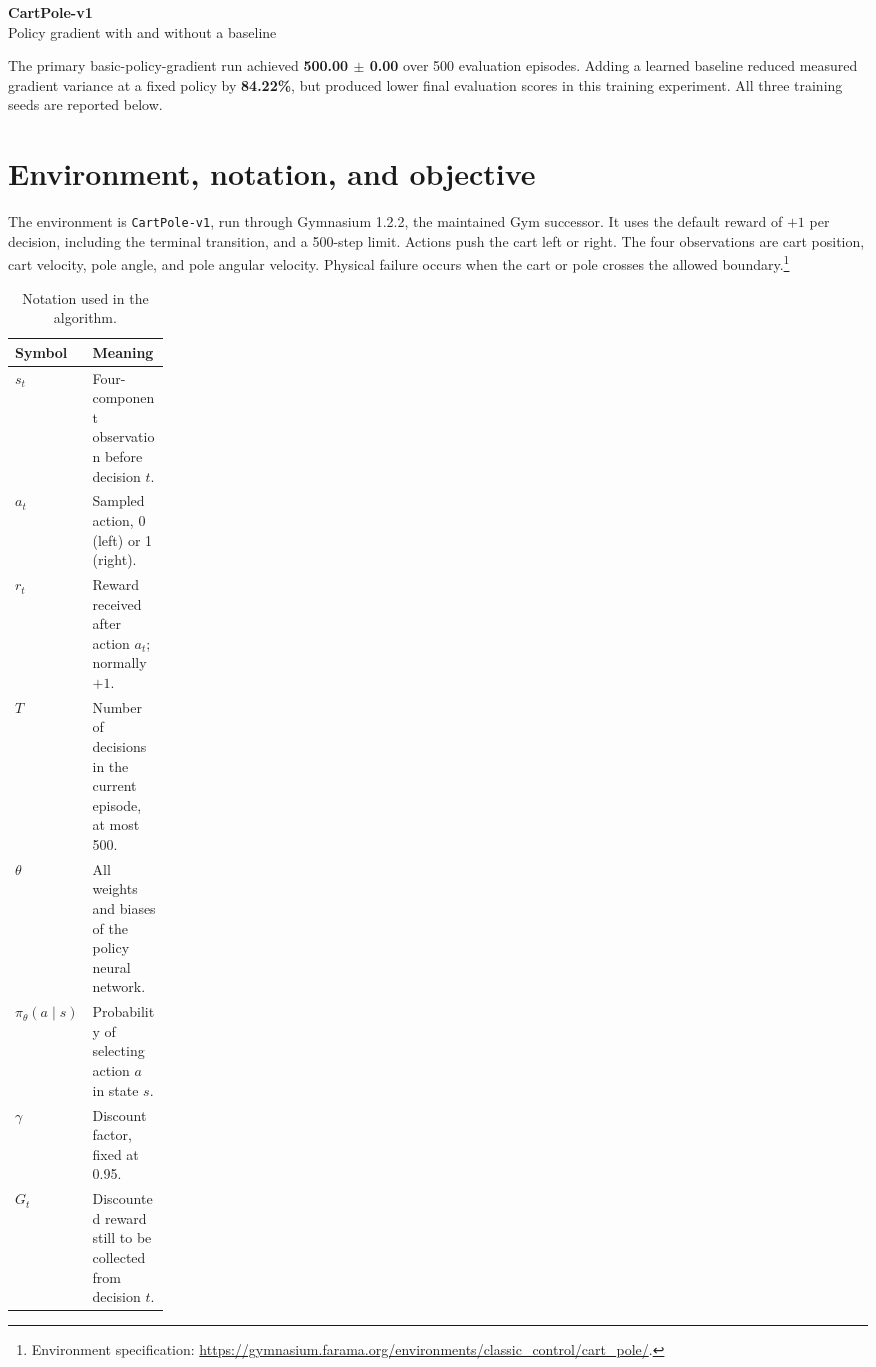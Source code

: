 \documentclass[11pt,letterpaper]{article}
\begin{document}
\begin{center}
{\LARGE\bfseries\color{navy} CartPole-v1}\\[5pt]
{\large Policy gradient with and without a baseline}
\end{center}

The primary basic-policy-gradient run achieved \textbf{500.00 $\pm$ 0.00} over 500 evaluation episodes. Adding a learned baseline reduced measured gradient variance at a fixed policy by \textbf{84.22\%}, but produced lower final evaluation scores in this training experiment. All three training seeds are reported below.

\section{Environment, notation, and objective}
The environment is \texttt{CartPole-v1}, run through Gymnasium 1.2.2, the maintained Gym successor. It uses the default reward of $+1$ per decision, including the terminal transition, and a 500-step limit. Actions push the cart left or right. The four observations are cart position, cart velocity, pole angle, and pole angular velocity. Physical failure occurs when the cart or pole crosses the allowed boundary.\footnote{Environment specification: \url{https://gymnasium.farama.org/environments/classic_control/cart_pole/}.}

\begin{table}[!ht]
\centering
\caption{Notation used in the algorithm.}
\begin{tabularx}{\linewidth}{@{}p{0.18\linewidth}X@{}}
\toprule
Symbol & Meaning\\
\midrule
$s_t$ & Four-component observation before decision $t$.\\
$a_t$ & Sampled action, 0 (left) or 1 (right).\\
$r_t$ & Reward received after action $a_t$; normally $+1$.\\
$T$ & Number of decisions in the current episode, at most 500.\\
$\theta$ & All weights and biases of the policy neural network.\\
$\pi_\theta(a\mid s)$ & Probability of selecting action $a$ in state $s$.\\
$\gamma$ & Discount factor, fixed at 0.95.\\
$G_t$ & Discounted reward still to be collected from decision $t$.\\
\bottomrule
\end{tabularx}
\end{table}
\end{document}
